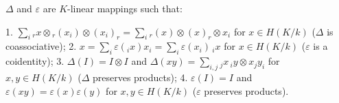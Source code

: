 $\Delta$ and $\varepsilon$ are $K$-linear mappings such that:

1. $\sum_i {}_r x \otimes {}_r(x_i) \otimes (x_i)_r = \sum_i {}_r(x) \otimes (x)_r \otimes x_i$ for $x \in H(K/k)$ ($\Delta$ is coassociative);
2. $x = \sum_i \varepsilon({}_i x)x_i = \sum_i \varepsilon(x_i) \, {}_i x$ for $x \in H(K/k)$ ($\varepsilon$ is a coidentity);
3. $\Delta(I) = I \otimes I$ and $\Delta(xy) = \sum_{i,j} {}_j x \, {}_i y \otimes x_j y_i$ for $x, y \in H(K/k)$ ($\Delta$ preserves products);
4. $\varepsilon(I) = I$ and $\varepsilon(xy) = \varepsilon(x)\varepsilon(y)$ for $x, y \in H(K/k)$ ($\varepsilon$ preserves products).
